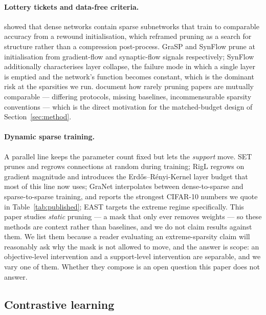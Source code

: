 \paragraph{Lottery tickets and data-free criteria.}
\citet{frankle2019lottery} showed that dense networks contain sparse subnetworks
that train to comparable accuracy from a rewound initialisation, which reframed
pruning as a search for structure rather than a compression post-process. GraSP
\citep{wang2020grasp} and SynFlow \citep{tanaka2020synflow} prune at
initialisation from gradient-flow and synaptic-flow signals respectively;
SynFlow additionally characterises layer collapse, the failure mode in which a
single layer is emptied and the network's function becomes constant, which is the
dominant risk at the sparsities we run. \citet{blalock2020state} document how
rarely pruning papers are mutually comparable --- differing protocols, missing
baselines, incommensurable sparsity conventions --- which is the direct
motivation for the matched-budget design of Section~\ref{sec:method}.

\paragraph{Dynamic sparse training.}
A parallel line keeps the parameter count fixed but lets the \emph{support} move.
SET \citep{mocanu2018set} prunes and regrows connections at random during
training; RigL \citep{evci2020rigl} regrows on gradient magnitude and introduces
the Erd\H{o}s--R\'{e}nyi-Kernel layer budget that most of this line now uses;
GraNet \citep{liu2021granet} interpolates between dense-to-sparse and
sparse-to-sparse training, and reports the strongest CIFAR-10 numbers we quote in
Table~\ref{tab:published}; EAST \citep{li2025east} targets the extreme regime
specifically. This paper studies \emph{static} pruning --- a mask that only ever
removes weights --- so these methods are context rather than baselines, and we do
not claim results against them. We list them because a reader evaluating an
extreme-sparsity claim will reasonably ask why the mask is not allowed to move,
and the answer is scope: an objective-level intervention and a support-level
intervention are separable, and we vary one of them. Whether they compose is an
open question this paper does not answer.

\subsection{Contrastive learning}

